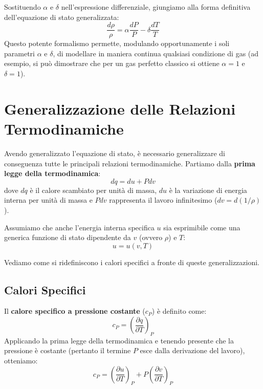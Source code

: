 Sostituendo $\alpha$ e $\delta$ nell'espressione differenziale, giungiamo alla forma definitiva dell'equazione di stato generalizzata:
\begin{equation}
\frac{d\rho}{\rho} = \alpha \frac{dP}{P} - \delta \frac{dT}{T}
\end{equation}
Questo potente formalismo permette, modulando opportunamente i soli parametri $\alpha$ e $\delta$, di modellare in maniera continua qualsiasi condizione di gas (ad esempio, si può dimostrare che per un gas perfetto classico si ottiene $\alpha = 1$ e $\delta = 1$).

\section{Generalizzazione delle Relazioni Termodinamiche}

Avendo generalizzato l'equazione di stato, è necessario generalizzare di conseguenza tutte le principali relazioni termodinamiche. Partiamo dalla \textbf{prima legge della termodinamica}:
\begin{equation}
dq = du + P dv
\end{equation}
dove $dq$ è il calore scambiato per unità di massa, $du$ è la variazione di energia interna per unità di massa e $P dv$ rappresenta il lavoro infinitesimo ($dv = d(1/\rho)$).

Assumiamo che anche l'energia interna specifica $u$ sia esprimibile come una generica funzione di stato dipendente da $v$ (ovvero $\rho$) e $T$:
\begin{equation}
u = u(v, T)
\end{equation}

Vediamo come si ridefiniscono i calori specifici a fronte di queste generalizzazioni.

\subsection{Calori Specifici}
Il \textbf{calore specifico a pressione costante} ($c_P$) è definito come:
\begin{equation}
c_P = \left( \frac{\partial q}{\partial T} \right)_P
\end{equation}
Applicando la prima legge della termodinamica e tenendo presente che la pressione è costante (pertanto il termine $P$ esce dalla derivazione del lavoro), otteniamo:
\begin{equation}
c_P = \left( \frac{\partial u}{\partial T} \right)_P + P \left( \frac{\partial v}{\partial T} \right)_P
\end{equation}

